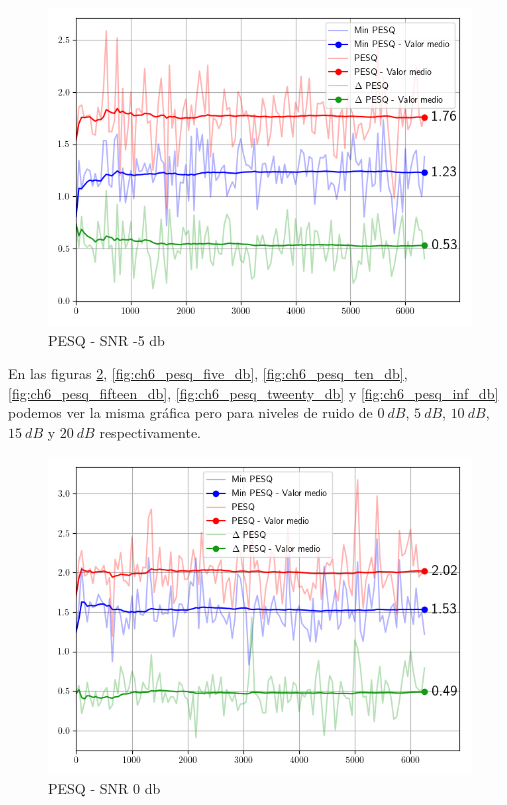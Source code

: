 \begin{figure}
	\centering
	\centerline{\includegraphics[scale=0.75]{images/ch6/af/objective_metrics/metric_PESQ_-5db.png}}
	\caption{PESQ - SNR -5 db}		\label{fig:ch6_pesq_minus_five_db}
\end{figure}

En las figuras \ref{fig:ch6_pesq_cero_db}, \ref{fig:ch6_pesq_five_db}, \ref{fig:ch6_pesq_ten_db}, \ref{fig:ch6_pesq_fifteen_db},
\ref{fig:ch6_pesq_tweenty_db} y \ref{fig:ch6_pesq_inf_db} podemos ver la misma gráfica pero para niveles de ruido de $\SI{0}{dB}$, $\SI{5}{dB}$, $\SI{10}{dB}$, $\SI{15}{dB}$ y $\SI{20}{dB}$ respectivamente. 

\begin{figure}
	\centering
	\centerline{\includegraphics[scale=0.75]{images/ch6/af/objective_metrics/metric_PESQ_0db.png}}
	\caption{PESQ - SNR 0 db}
	\label{fig:ch6_pesq_cero_db}
\end{figure}

